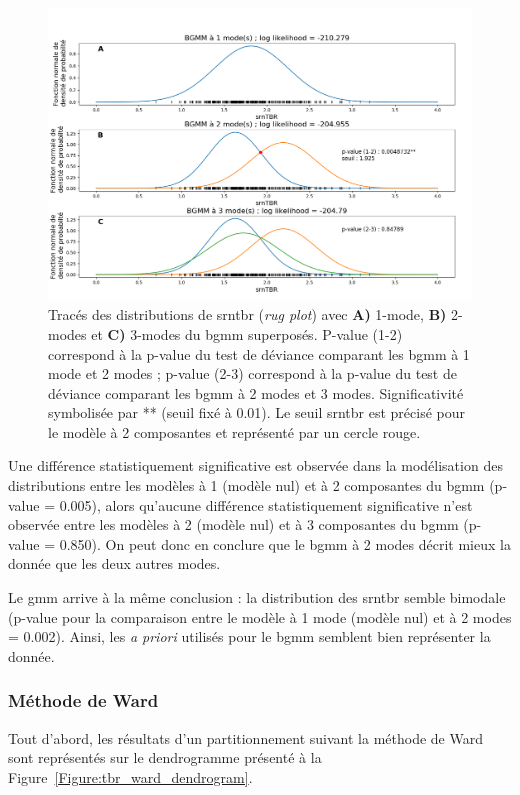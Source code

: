 \begin{figure}[h!]
  \centering
	\includegraphics[width=1.0\linewidth]{figures/chapter-4/tbr-bgmm} 
  \caption{Tracés des distributions de \gls{srntbr} (\textit{rug plot}) avec \textbf{A)} 1-mode, \textbf{B)} 2-modes et \textbf{C)} 3-modes du \gls{bgmm} superposés. P-value (1-2) correspond
	à la p-value du test de déviance comparant les \gls{bgmm} à 1 mode et 2 modes ; p-value (2-3) correspond à la p-value du test de déviance comparant les \gls{bgmm}
	à 2 modes et 3 modes. Significativité symbolisée par ** (seuil fixé à 0.01). Le seuil \gls{srntbr} est précisé pour le modèle à 2 composantes et représenté par un cercle rouge.}
  \label{Figure:tbr_bgmm} 
\end{figure}

Une différence statistiquement significative est observée dans la modélisation des distributions entre les modèles à 1 (modèle nul) et à 2 composantes 
du \gls{bgmm} (p-value = 0.005), alors qu'aucune différence statistiquement significative n'est observée entre les modèles à 2 (modèle nul) 
et à 3 composantes du \gls{bgmm} (p-value = 0.850). On peut donc en conclure que le \gls{bgmm} à 2 modes décrit mieux la donnée que les deux
autres modes. 

Le \gls{gmm} arrive à la même conclusion : la distribution des \gls{srntbr} semble bimodale (p-value pour la comparaison
entre le modèle à 1 mode (modèle nul) et à 2 modes = 0.002). Ainsi, les \textit{a priori} utilisés pour le \gls{bgmm} semblent bien 
représenter la donnée. 

\subsubsection{Méthode de Ward}
Tout d'abord, les résultats d'un partitionnement suivant la méthode de Ward sont représentés sur le dendrogramme présenté à la 
Figure~\ref{Figure:tbr_ward_dendrogram}. 


